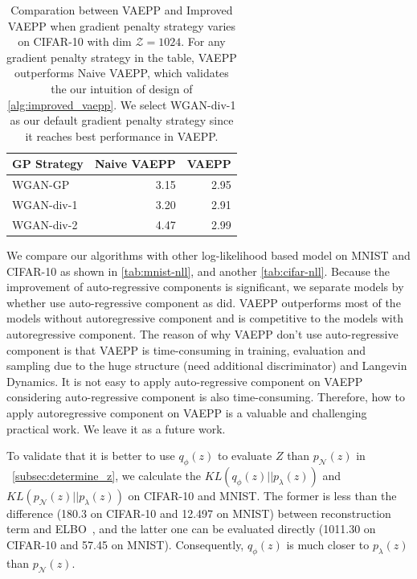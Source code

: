 \begin{table}[tb]
\centering
\begin{tabular}{lrr}  
\toprule
GP Strategy  &  Naive VAEPP  & VAEPP \\
\midrule
WGAN-GP      &  3.15   & 2.95      \\
WGAN-div-1   &  3.20   & 2.91      \\
WGAN-div-2   &  4.47   & 2.99      \\
\bottomrule
\end{tabular}
\caption{Comparation between VAEPP and Improved VAEPP when gradient penalty strategy varies on CIFAR-10 with dim $\mathcal{Z} = 1024$. For any gradient penalty strategy in the table, VAEPP outperforms Naive VAEPP, which validates the our intuition of design of \cref{alg:improved_vaepp}. We select WGAN-div-1 as our default gradient penalty strategy since it reaches best performance in VAEPP. 
}
\label{tab:compare_nD_over_R}
\end{table}

We compare our algorithms with other log-likelihood based model on MNIST and CIFAR-10 as shown in \cref{tab:mnist-nll}, and another	\cref{tab:cifar-nll}. Because the improvement of auto-regressive components is significant, we separate models by whether use auto-regressive component as \cite{maaloe2019biva} did. VAEPP outperforms most of the models without autoregressive component and is competitive to the models with autoregressive component. The reason of why VAEPP don't use auto-regressive component is that VAEPP is time-consuming in training,  evaluation and sampling due to the huge structure (need additional discriminator) and Langevin Dynamics. It is not easy to apply auto-regressive component on VAEPP considering auto-regressive component is also time-consuming. 
Therefore, how to apply autoregressive component on VAEPP is a valuable and challenging practical work. We leave it as a future work.

To validate that it is better to use $q_\phi(z)$ to evaluate $Z$ than $p_\mathcal{N}(z)$ in ~\cref{subsec:determine_z}, we calculate the $KL(q_\phi(z)||p_\lambda(z))$ and $KL(p_\mathcal{N}(z)||p_\lambda(z))$ on CIFAR-10 and MNIST. The former is less than the difference (180.3 on CIFAR-10 and 12.497 on MNIST) between reconstruction term and ELBO~\cite{hoffman2016elbo}, and the latter one can be evaluated directly (1011.30 on CIFAR-10 and 57.45 on MNIST). Consequently, $q_\phi(z)$ is much closer to $p_\lambda(z)$ than $p_\mathcal{N}(z)$. 

